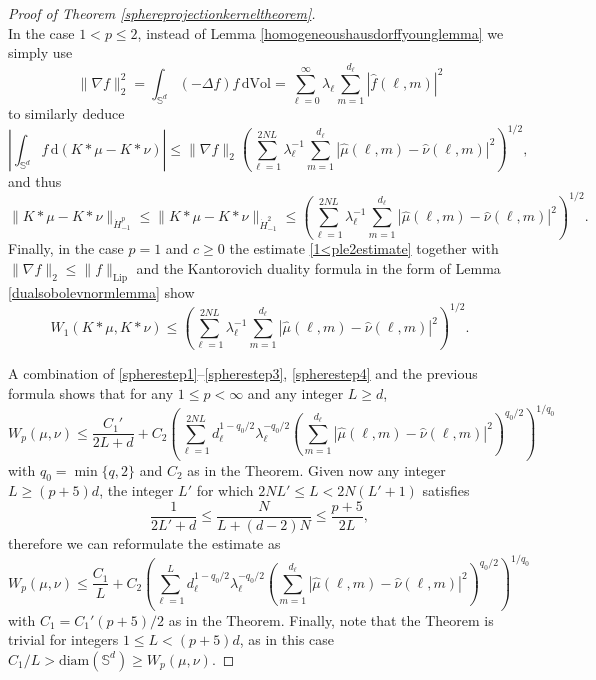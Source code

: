 \documentclass[11pt,a4paper]{article}
\theoremstyle{definition}
\begin{document}
\begin{proof}[Proof of Theorem \ref{sphereprojectionkerneltheorem}]
\begin{equation}
\end{equation}
In the case $1<p \le 2$, instead of Lemma \ref{homogeneoushausdorffyounglemma} we simply use
\[ \| \nabla f \|_2^2 = \int_{\mathbb{S}^d} (-\Delta f) f \, \mathrm{d}\mathrm{Vol} = \sum_{\ell=0}^{\infty} \lambda_{\ell} \sum_{m=1}^{d_{\ell}} |\widehat{f}(\ell,m)|^2 \]
to similarly deduce
\begin{equation}\label{1<ple2estimate}
\left| \int_{\mathbb{S}^d} f \, \mathrm{d}(K*\mu - K*\nu) \right| \le \| \nabla f \|_2 \left( \sum_{\ell=1}^{2NL} \lambda_{\ell}^{-1} \sum_{m=1}^{d_{\ell}} |\widehat{\mu}(\ell,m) - \widehat{\nu}(\ell,m)|^2 \right)^{1/2} ,
\end{equation}
and thus
\begin{equation}\label{spherestep4}
\| K*\mu - K*\nu \|_{\dot{H}_{-1}^p} \le \| K*\mu - K*\nu \|_{\dot{H}_{-1}^2} \le \left( \sum_{\ell=1}^{2NL} \lambda_{\ell}^{-1} \sum_{m=1}^{d_{\ell}} |\widehat{\mu}(\ell,m) - \widehat{\nu}(\ell,m)|^2 \right)^{1/2} .
\end{equation}
Finally, in the case $p=1$ and $c \ge 0$ the estimate \eqref{1<ple2estimate} together with $\| \nabla f \|_2 \le \| f \|_{\mathrm{Lip}}$ and the Kantorovich duality formula in the form of Lemma \ref{dualsobolevnormlemma} show
\[ W_1 (K*\mu, K*\nu) \le \left( \sum_{\ell=1}^{2NL} \lambda_{\ell}^{-1} \sum_{m=1}^{d_{\ell}} |\widehat{\mu}(\ell,m) - \widehat{\nu}(\ell,m)|^2 \right)^{1/2} . \]

A combination of \eqref{spherestep1}--\eqref{spherestep3}, \eqref{spherestep4} and the previous formula shows that for any $1 \le p < \infty$ and any integer $L \ge d$,
\[ W_p (\mu, \nu) \le \frac{C_1'}{2L+d} + C_2 \left( \sum_{\ell=1}^{2NL} d_{\ell}^{1-q_0/2} \lambda_{\ell}^{-q_0/2} \left( \sum_{m=1}^{d_{\ell}} |\widehat{\mu}(\ell,m) - \widehat{\nu}(\ell,m)|^2 \right)^{q_0/2} \right)^{1/q_0} \]
with $q_0=\min \{ q,2 \}$ and $C_2$ as in the Theorem. Given now any integer $L \ge (p+5)d$, the integer $L'$ for which $2NL' \le L < 2N(L'+1)$ satisfies
\[ \frac{1}{2L'+d} \le \frac{N}{L+(d-2) N} \le \frac{p+5}{2L}, \]
therefore we can reformulate the estimate as
\[ W_p (\mu, \nu) \le \frac{C_1}{L} + C_2 \left( \sum_{\ell=1}^L d_{\ell}^{1-q_0/2} \lambda_{\ell}^{-q_0/2} \left( \sum_{m=1}^{d_{\ell}} |\widehat{\mu}(\ell,m) - \widehat{\nu}(\ell,m)|^2 \right)^{q_0/2} \right)^{1/q_0} \]
with $C_1=C_1' (p+5)/2$ as in the Theorem. Finally, note that the Theorem is trivial for integers $1 \le L < (p+5)d$, as in this case $C_1/L>\mathrm{diam}(\mathbb{S}^d) \ge W_p (\mu, \nu)$.
\end{proof}
\end{document}
